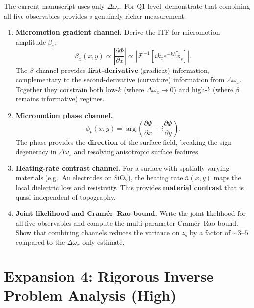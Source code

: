 \documentclass[11pt,a4paper]{article}
\begin{document}
The current manuscript uses only $\Delta\omega_x$. For Q1 level, demonstrate that combining all five observables provides a genuinely richer measurement.

\begin{enumerate}[label=\textbf{M\arabic*}, leftmargin=*]

    \item \textbf{Micromotion gradient channel.}
    Derive the ITF for micromotion amplitude $\beta_x$:
    \begin{equation}
    \beta_x(x,y) \propto \left|\frac{\partial\Phi}{\partial x}\right|
    \propto \left|\mathcal{F}^{-1}[ik_x e^{-kh} \tilde{\phi}_s]\right|.
    \end{equation}
    The $\beta$ channel provides \textbf{first-derivative} (gradient) information, complementary to the second-derivative (curvature) information from $\Delta\omega_x$. Together they constrain both low-$k$ (where $\Delta\omega_x \to 0$) and high-$k$ (where $\beta$ remains informative) regimes.

    \item \textbf{Micromotion phase channel.}
    \begin{equation}
    \phi_\mu(x,y) = \arg\left(\frac{\partial\Phi}{\partial x} + i\frac{\partial\Phi}{\partial y}\right).
    \end{equation}
    The phase provides the \textbf{direction} of the surface field, breaking the sign degeneracy in $\Delta\omega_x$ and resolving anisotropic surface features.

    \item \textbf{Heating-rate contrast channel.}
    For a surface with spatially varying materials (e.g.\ Au electrodes on SiO$_2$), the heating rate $\dot{\bar{n}}(x,y)$ maps the local dielectric loss and resistivity. This provides \textbf{material contrast} that is quasi-independent of topography.

    \item \textbf{Joint likelihood and Cram\'er--Rao bound.}
    Write the joint likelihood for all five observables and compute the multi-parameter Cram\'er--Rao bound. Show that combining channels reduces the variance on $z_s$ by a factor of $\sim 3$--$5$ compared to the $\Delta\omega_x$-only estimate.

\end{enumerate}

\section{Expansion 4: Rigorous Inverse Problem Analysis (High)}
\end{document}
